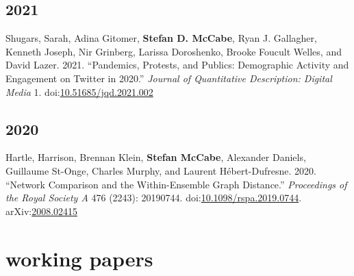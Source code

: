 \documentclass[11pt, letter]{article}
\begin{document}
\subsection{2021}
\begin{hangparas}{.25in}{1}
Shugars, Sarah, Adina Gitomer, \textbf{Stefan D. McCabe}, Ryan J. Gallagher,
Kenneth Joseph, Nir Grinberg, Larissa Doroshenko, Brooke Foucult Welles, and
David Lazer. 2021. ``Pandemics, Protests, and Publics: Demographic Activity and
Engagement on Twitter in 2020.'' \textit{Journal of Quantitative Description:
  Digital Media} 1.
doi:\href{https://doi.org/10.51685/jqd.2021.002}{10.51685/jqd.2021.002}
\end{hangparas}

\subsection{2020}
\begin{hangparas}{.25in}{1}
  Hartle, Harrison, Brennan Klein, \textbf{Stefan McCabe}, Alexander Daniels,
  Guillaume St-Onge, Charles Murphy, and Laurent Hébert-Dufresne. 2020.
  ``Network Comparison and the Within-Ensemble Graph Distance.''
  \textit{Proceedings of the Royal Society A} 476 (2243): 20190744.
  doi:\href{https://doi.org/10.1098/rspa.2019.0744}{10.1098/rspa.2019.0744}.
  arXiv:\href{https://arxiv.org/abs/2008.02415}{2008.02415} \vspace{2mm}
\end{hangparas}

\section{working papers}
\end{document}
